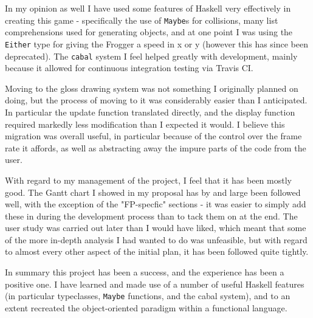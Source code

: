 \documentclass[12pt, a4paper]{report}
\begin{document}
\par

In my opinion as well I have used some features of Haskell very effectively in creating this game - specifically the use of \verb|Maybe|s for collisions, many list comprehensions used for generating objects, and at one point I was using the \verb|Either| type for giving the Frogger a speed in x or y (however this has since been deprecated).
The \verb|cabal| system I feel helped greatly with development, mainly because it allowed for continuous integration testing via Travis CI.

\par

Moving to the gloss drawing system was not something I originally planned on doing, but the process of moving to it was considerably easier than I anticipated.
In particular the update function translated directly, and the display function required markedly less modification than I expected it would.
I believe this migration was overall useful, in particular because of the control over the frame rate it affords, as well as abstracting away the impure parts of the code from the user.

\par

With regard to my management of the project, I feel that it has been mostly good.
The Gantt chart I showed in my proposal has by and large been followed well, with the exception of the "FP-specfic" sections - it was easier to simply add these in during the development process than to tack them on at the end.
The user study was carried out later than I would have liked, which meant that some of the more in-depth analysis I had wanted to do was unfeasible, but with regard to almost every other aspect of the initial plan, it has been followed quite tightly.

\par

In summary this project has been a success, and the experience has been a positive one.
I have learned and made use of a number of useful Haskell features (in particular typeclasses, \verb|Maybe| functions, and the cabal system), and to an extent recreated the object-oriented paradigm within a functional language.
\end{document}
